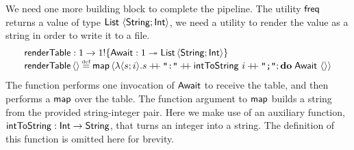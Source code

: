 \documentclass[12pt,phd,lfcs,twoside,openright,logo,leftchapter,normalheadings]{infthesis}
\theoremstyle{plain}
\theoremstyle{definition}
\begin{document}
We need one more building block to complete the pipeline. The utility
$\mathsf{freq}$ returns a value of type $\mathsf{List}~\langle \mathsf{String};\mathsf{Int} \rangle$, we need
a utility to render the value as a string in order to write it to a
file.
%
\[
  \bl
    \printTable : \UnitType \to \UnitType \eff \{\Await : \UnitType \opto \List\,\Record{\String;\Int}\}\\
    \printTable\,\Unit \defas
        \map\,\Record{\lambda\Record{s;i}.s \concat \strlit{:} \concat \intToString~i \concat \strlit{;};\Do\;\Await~\Unit}
  \el
\]
%
The function performs one invocation of $\mathsf{Await}$ to receive the table,
and then performs a $\mathsf{map}$ over the table. The function argument to
$\mathsf{map}$ builds a string from the provided string-integer pair.
%
Here we make use of an auxiliary function,
$\mathsf{intToString} : \mathsf{Int} \to \mathsf{String}$, that turns an integer into a
string. The definition of this function is omitted here for brevity.
%
%
%
\end{document}
